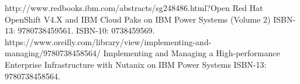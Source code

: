 %
%
%


\begin{publications}
    \publication
        {http://www.redbooks.ibm.com/abstracts/sg248486.html?Open}
        {Red Hat OpenShift V4.X and IBM Cloud Paks on IBM Power Systems (Volume 2)}
        ISBN-13: 9780738459561. ISBN-10: 0738459569.
        \newline
    \publication
        {https://www.oreilly.com/library/view/implementing-and-managing/9780738458564/}
        {Implementing and Managing a High-performance Enterprise Infrastructure with Nutanix on IBM Power Systems}
        ISBN-13: 9780738458564.
        \newline
\end{publications}